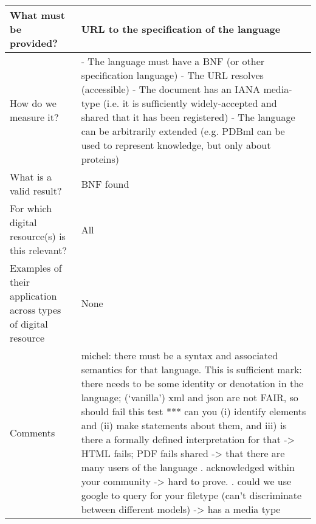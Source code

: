 \documentclass[english]{article}
\begin{document}
\begin{longtable}{|p{5cm}|p{9cm}|}
\hline
What must be provided? &  

URL to the specification of the language


\\



\hline
How do we measure it? &  

- The language must have a BNF (or other specification language) \newline 
- The URL resolves (accessible) \newline 
- The document has an IANA media-type (i.e. it is sufficiently widely-accepted and shared that it has been registered) \newline 
- The language can be arbitrarily extended (e.g. PDBml can be used to represent knowledge, but only about proteins) \newline 



\\



\hline
What is a valid result? &  


BNF found



\\



\hline
For which digital resource(s) is this relevant? &  All\\



\hline
Examples of their application across types of digital resource &  None

\\



\hline

Comments & 

michel: there must be a syntax and associated semantics for that language.  This is sufficient \newline 
mark: there needs to be some identity or denotation in the language; (‘vanilla’) xml and json are not FAIR, so should fail this test\newline 
\newline 
*** can you (i) identify elements and (ii) make statements about them, and iii) is there a formally defined interpretation for that 
 -> HTML fails; PDF fails
\newline 
shared\newline 
-> that there are many users of the language\newline 
. acknowledged within your community\newline 
 -> hard to prove.\newline 
. could we use google to query for your filetype (can’t discriminate between different models)\newline 
-> has a media type\newline 


\end{longtable}
\end{document}
